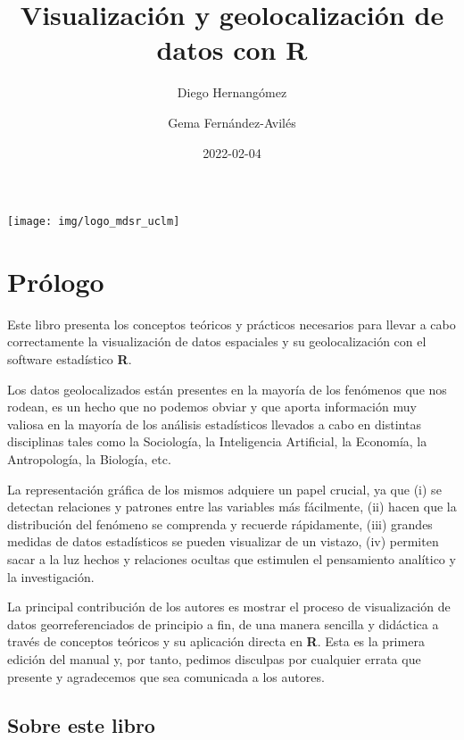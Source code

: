\documentclass[
]{book}
\title{Visualización y geolocalización de datos con R}
\author{Diego Hernangómez \and Gema Fernández-Avilés}
\date{2022-02-04}
\theoremstyle{definition}
\theoremstyle{definition}
\theoremstyle{definition}
\theoremstyle{definition}
\theoremstyle{remark}
\begin{document}
\maketitle

{
\hypersetup{linkcolor=}
\setcounter{tocdepth}{1}
\tableofcontents
}
\begin{center}\texttt{[image: img/logo\_mdsr\_uclm]} \end{center}

\hypertarget{pruxf3logo}{%
\chapter*{Prólogo}\label{pruxf3logo}}

Este libro presenta los conceptos teóricos y prácticos necesarios para llevar a
cabo correctamente la visualización de datos espaciales y su geolocalización con
el software estadístico \textbf{R}.

Los datos geolocalizados están presentes en la mayoría de los fenómenos que nos
rodean, es un hecho que no podemos obviar y que aporta información muy valiosa
en la mayoría de los análisis estadísticos llevados a cabo en distintas
disciplinas tales como la Sociología, la Inteligencia Artificial, la Economía,
la Antropología, la Biología, etc.

La representación gráfica de los mismos adquiere un papel crucial, ya que (i) se
detectan relaciones y patrones entre las variables más fácilmente, (ii) hacen
que la distribución del fenómeno se comprenda y recuerde rápidamente, (iii)
grandes medidas de datos estadísticos se pueden visualizar de un vistazo, (iv)
permiten sacar a la luz hechos y relaciones ocultas que estimulen el pensamiento
analítico y la investigación.

La principal contribución de los autores es mostrar el proceso de visualización
de datos georreferenciados de principio a fin, de una manera sencilla y
didáctica a través de conceptos teóricos y su aplicación directa en \textbf{R}. Esta
es la primera edición del manual y, por tanto, pedimos disculpas por cualquier
errata que presente y agradecemos que sea comunicada a los autores.

\hypertarget{sobre-este-libro}{%
\section*{Sobre este libro}\label{sobre-este-libro}}
\end{document}
